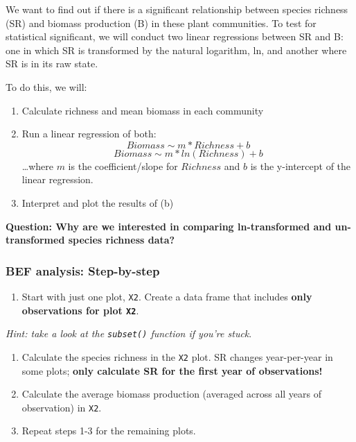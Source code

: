 \documentclass[]{article}
\providecommand{\tightlist}{%
  \setlength{\itemsep}{0pt}\setlength{\parskip}{0pt}}
\begin{document}
We want to find out if there is a significant relationship between
species richness (SR) and biomass production (B) in these plant
communities. To test for statistical significant, we will conduct two
linear regressions between SR and B: one in which SR is transformed by
the natural logarithm, ln, and another where SR is in its raw state.

To do this, we will:

\begin{enumerate}
\def\labelenumi{\alph{enumi})}
\item
  Calculate richness and mean biomass in each community
\item
  Run a linear regression of both: \[Biomass \sim m * Richness + b\]
  \[Biomass \sim m * ln(Richness) + b\] \ldots{}where \(m\) is the
  coefficient/slope for \(Richness\) and \(b\) is the y-intercept of the
  linear regression.
\item
  Interpret and plot the results of (b)
\end{enumerate}

\textbf{Question: Why are we interested in comparing ln-transformed and
un-transformed species richness data?}

\subsubsection{BEF analysis:
Step-by-step}\label{bef-analysis-step-by-step}

\begin{enumerate}
\def\labelenumi{\arabic{enumi}.}
\tightlist
\item
  Start with just one plot, \texttt{X2}. Create a data frame that
  includes \textbf{only observations for plot \texttt{X2}}.
\end{enumerate}

\emph{Hint: take a look at the \texttt{subset()} function if you're
stuck}.

\begin{enumerate}
\def\labelenumi{\arabic{enumi}.}
\setcounter{enumi}{1}
\item
  Calculate the species richness in the \texttt{X2} plot. SR changes
  year-per-year in some plots; \textbf{only calculate SR for the first
  year of observations!}
\item
  Calculate the average biomass production (averaged across all years of
  observation) in \texttt{X2}.
\item
  Repeat steps 1-3 for the remaining plots.
\end{enumerate}
\end{document}
